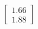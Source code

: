 \documentclass[preview]{standalone}
\begin{document}
\begin{align*}
\begin{bmatrix} 1.66 \\ 1.88 \end{bmatrix}
\end{align*}
\end{document}

